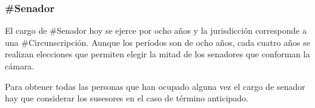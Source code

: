 \subsubsection{\#Senador}

El cargo de \#Senador hoy se ejerce por ocho años y la jurisdicción
corresponde a una \#Circunscripción. Aunque los períodos son de ocho
años, cada cuatro años se realizan elecciones que permiten elegir la
mitad de los senadores que conforman la cámara.

Para obtener todas las personas que han ocupado alguna vez el cargo de
senador hay que considerar los susesores en el caso de término
anticipado.

\begin{description}
  
\end{description}